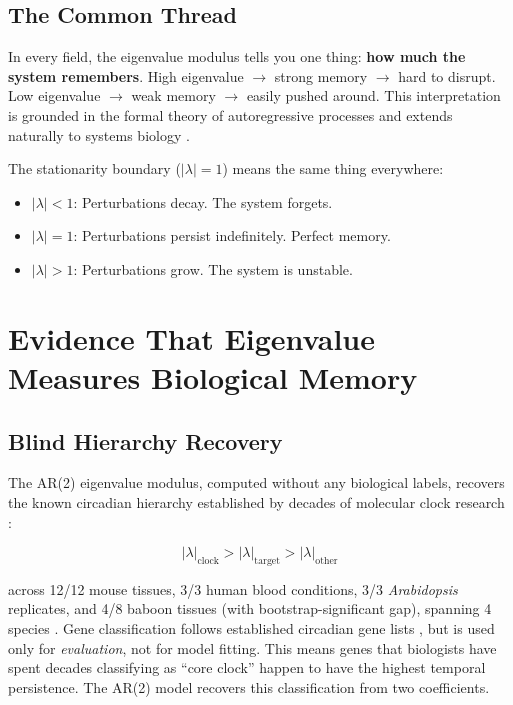 \documentclass[11pt,letterpaper]{article}
\begin{document}
\subsection{The Common Thread}

In every field, the eigenvalue modulus tells you one thing: \textbf{how much the system remembers}. High eigenvalue $\rightarrow$ strong memory $\rightarrow$ hard to disrupt. Low eigenvalue $\rightarrow$ weak memory $\rightarrow$ easily pushed around. This interpretation is grounded in the formal theory of autoregressive processes \citep{hamilton1994time, box2015time} and extends naturally to systems biology \citep{alon2006introduction, stelling2004robustness}.

The stationarity boundary ($|\lambda| = 1$) means the same thing everywhere:
\begin{itemize}
\item $|\lambda| < 1$: Perturbations decay. The system forgets.
\item $|\lambda| = 1$: Perturbations persist indefinitely. Perfect memory.
\item $|\lambda| > 1$: Perturbations grow. The system is unstable.
\end{itemize}

\section{Evidence That Eigenvalue Measures Biological Memory}

\subsection{Blind Hierarchy Recovery}

The AR(2) eigenvalue modulus, computed without any biological labels, recovers the known circadian hierarchy established by decades of molecular clock research \citep{takahashi2017transcriptional, panda2002coordinated, ko2006molecular}:

\begin{equation}
|\lambda|_{\text{clock}} > |\lambda|_{\text{target}} > |\lambda|_{\text{other}}
\end{equation}

across 12/12 mouse tissues, 3/3 human blood conditions, 3/3 \textit{Arabidopsis} replicates, and 4/8 baboon tissues (with bootstrap-significant gap), spanning 4 species \citep{whiteside2026par2a}. Gene classification follows established circadian gene lists \citep{panda2002coordinated, storch2002extensive, ko2006molecular}, but is used only for \textit{evaluation}, not for model fitting. This means genes that biologists have spent decades classifying as ``core clock'' happen to have the highest temporal persistence. The AR(2) model recovers this classification from two coefficients.
\end{document}
